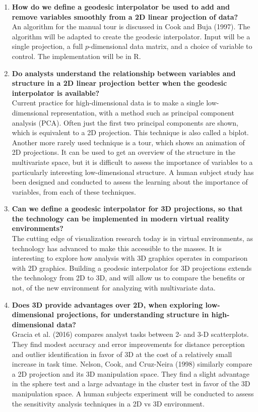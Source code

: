 \documentclass[
  11,
]{article}
\begin{document}
\begin{enumerate}
\def\labelenumi{\arabic{enumi}.}
\item
  \textbf{How do we define a geodesic interpolator be used to add and remove variables smoothly from a 2D linear projection of data?}\\
  An algorithm for the manual tour is discussed in Cook and Buja (1997). The algorithm will be adapted to create the geodesic interpolator. Input will be a single projection, a full \(p\)-dimensional data matrix, and a choice of variable to control. The implementation will be in R.
\item
  \textbf{Do analysts understand the relationship between variables and structure in a 2D linear projection better when the geodesic interpolator is available?}\\
  Current practice for high-dimensional data is to make a single low-dimensional representation, with a method such as principal component analysis (PCA). Often just the first two principal components are shown, which is equivalent to a 2D projection. This technique is also called a biplot. Another more rarely used technique is a tour, which shows an animation of 2D projections. It can be used to get an overview of the structure in the multivariate space, but it is difficult to assess the importance of variables to a particularly interesting low-dimensional structure. A human subject study has been designed and conducted to assess the learning about the importance of variables, from each of these techniques.
\item
  \textbf{Can we define a geodesic interpolator for 3D projections, so that the technology can be implemented in modern virtual reality environments?}\\
  The cutting edge of visualization research today is in virtual environments, as technology has advanced to make this accessible to the masses. It is interesting to explore how analysis with 3D graphics operates in comparison with 2D graphics. Building a geodesic interpolator for 3D projections extends the technology from 2D to 3D, and will allow us to compare the benefits or not, of the new environment for analyzing with multivariate data.
\item
  \textbf{Does 3D provide advantages over 2D, when exploring low-dimensional projections, for understanding structure in high-dimensional data? }\\
  Gracia et al. (2016) compares analyst tasks between 2- and 3-D scatterplots. They find modest accuracy and error improvements for distance perception and outlier identification in favor of 3D at the cost of a relatively small increase in task time. Nelson, Cook, and Cruz-Neira (1998) similarly compare a 2D projection and its 3D manipulation space. They find a slight advantage in the sphere test and a large advantage in the cluster test in favor of the 3D manipulation space. A human subjects experiment will be conducted to assess the sensitivity analysis techniques in a 2D vs 3D environment.
\end{enumerate}
\end{document}

